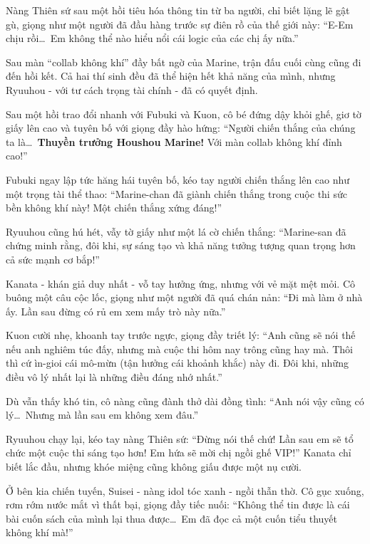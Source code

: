 \documentclass[../main.tex]{subfiles}
\begin{document}
Nàng Thiên sứ sau một hồi tiêu hóa thông tin từ ba người, chỉ biết lặng lẽ gật gù, giọng như một người đã đầu hàng trước sự điên rồ của thế giới này: ``E-Em chịu rồi\dots\ Em không thể nào hiểu nổi cái logic của các chị ấy nữa.''

\ct

Sau màn ``collab không khí'' đầy bất ngờ của Marine, trận đấu cuối cùng cũng đi đến hồi kết. Cả hai thí sinh đều đã thể hiện hết khả năng của mình, nhưng Ryuuhou - với tư cách trọng tài chính - đã có quyết định.

Sau một hồi trao đổi nhanh với Fubuki và Kuon, cô bé đứng dậy khỏi ghế, giơ tờ giấy lên cao và tuyên bố với giọng đầy hào hứng: ``Người chiến thắng của chúng ta là\dots\ \textbf{Thuyền trưởng Houshou Marine!} Với màn collab không khí đỉnh cao!''

Fubuki ngay lập tức hăng hái tuyên bố, kéo tay người chiến thắng lên cao như một trọng tài thể thao: ``Marine-chan đã giành chiến thắng trong cuộc thi sức bền không khí này! Một chiến thắng xứng đáng!''

Ryuuhou cũng hú hét, vẫy tờ giấy như một lá cờ chiến thắng: ``Marine-san đã chứng minh rằng, đôi khi, sự sáng tạo và khả năng tưởng tượng quan trọng hơn cả sức mạnh cơ bắp!''


Kanata - khán giả duy nhất - vỗ tay hưởng ứng, nhưng với vẻ mặt mệt mỏi. Cô buông một câu cộc lốc, giọng như một người đã quá chán nản: ``Đi mà làm ở nhà ấy. Lần sau đừng có rủ em xem mấy trò này nữa.''

Kuon cười nhẹ, khoanh tay trước ngực, giọng đầy triết lý: ``Anh cũng sẽ nói thế nếu anh nghiêm túc đấy, nhưng mà cuộc thi hôm nay trông cũng hay mà. Thôi thì cứ ìn-gioi cái mô-mừn (tận hưởng cái khoảnh khắc) này đi. Đôi khi, những điều vô lý nhất lại là những điều đáng nhớ nhất.''

Dù vẫn thấy khó tin, cô nàng cũng đành thở dài đồng tình: ``Anh nói vậy cũng có lý\dots\ Nhưng mà lần sau em không xem đâu.''

Ryuuhou chạy lại, kéo tay nàng Thiên sứ: ``Đừng nói thế chứ! Lần sau em sẽ tổ chức một cuộc thi sáng tạo hơn! Em hứa sẽ mời chị ngồi ghế VIP!'' Kanata chỉ biết lắc đầu, nhưng khóe miệng cũng không giấu được một nụ cười.

Ở bên kia chiến tuyến, Suisei - nàng idol tóc xanh - ngồi thẫn thờ. Cô gục xuống, rơm rớm nước mắt vì thất bại, giọng đầy tiếc nuối: ``Không thể tin được là cái bài cuốn sách của mình lại thua được\dots\ Em đã đọc cả một cuốn tiểu thuyết không khí mà!''
\end{document}
